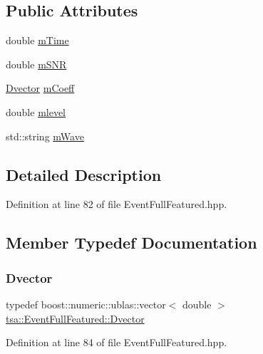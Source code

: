 \subsection*{Public Attributes}
\begin{DoxyCompactItemize}
\item 
double \hyperlink{classtsa_1_1_event_full_featured_aa7692d87294f90489dacf523851e3c27}{m\+Time}
\item 
double \hyperlink{classtsa_1_1_event_full_featured_a49a72cabed27a5469df2f4bcaea6aa3f}{m\+S\+NR}
\item 
\hyperlink{classtsa_1_1_event_full_featured_a6488de4b125cea43e4528244e3300ace}{Dvector} \hyperlink{classtsa_1_1_event_full_featured_a65ea47ec82b8f5a3c5ea505f9e7416c0}{m\+Coeff}
\item 
double \hyperlink{classtsa_1_1_event_full_featured_a80b882485bb57e529fdefabbb96d86e8}{mlevel}
\item 
std\+::string \hyperlink{classtsa_1_1_event_full_featured_ac7d44616083f5a5b2a403986b0c7bf6c}{m\+Wave}
\end{DoxyCompactItemize}


\subsection{Detailed Description}


Definition at line 82 of file Event\+Full\+Featured.\+hpp.



\subsection{Member Typedef Documentation}
\mbox{\label{classtsa_1_1_event_full_featured_a6488de4b125cea43e4528244e3300ace}} 
\subsubsection{\texorpdfstring{Dvector}{Dvector}}
{\footnotesize\ttfamily typedef boost\+::numeric\+::ublas\+::vector$<$ double $>$ \hyperlink{classtsa_1_1_event_full_featured_a6488de4b125cea43e4528244e3300ace}{tsa\+::\+Event\+Full\+Featured\+::\+Dvector}}



Definition at line 84 of file Event\+Full\+Featured.\+hpp.



